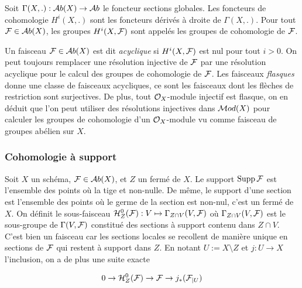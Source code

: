 \begin{defn}
Soit $\Gamma(X,.):\mathcal{A} b(X)\rightarrow \mathcal{A} b$ le foncteur sections globales. Les foncteurs de cohomologie $H^i(X,.)$ sont les foncteurs dérivés à droite de $\Gamma(X,.)$. Pour tout $\mathcal{F}\in \mathcal{A} b(X)$, les groupes $H^i(X,\mathcal{F})$ sont appelés les groupes de cohomologie de $\mathcal{F}$.
\end{defn}


Un faisceau $\mathcal{F}\in \mathcal{A} b(X)$ est dit \textit{acyclique} si $H^i(X,\mathcal{F})$ est nul pour tout $i>0$. On peut toujours remplacer une résolution injective de $\mathcal{F}$ par une résolution acyclique pour le calcul des groupes de cohomologie de $\mathcal{F}$. Les faisceaux \textit{flasques} donne une classe de faisceaux acycliques, ce sont les faisceaux dont les flèches de restriction sont surjectives. De plus, tout $\mathcal{O}_X$-module injectif est flasque, on en déduit que l'on peut utiliser des résolutions injectives dans $\mathcal{M} od(X)$ pour calculer les groupes de cohomologie d'un $\mathcal{O}_X$-module vu comme faisceau de groupes abélien sur $X$.

\subsubsection{Cohomologie à support}

Soit $X$ un schéma, $\mathcal{F}\in \mathcal{A} b(X)$, et $Z$ un fermé de $X$. Le support $\operatorname{Supp}\mathcal{F}$ est l'ensemble des points où la tige et non-nulle. De même, le support d'une section est l'ensemble des points où le germe de la section est non-nul, c'est un fermé de $X$. On définit le sous-faisceau $\mathcal{H} ^0 _Z(\mathcal{F}):V\mapsto \Gamma_{Z\cap V}(V,\mathcal{F})$ où $\Gamma_{Z\cap V}(V,\mathcal{F})$ est le sous-groupe de $\Gamma(V,\mathcal{F})$ constitué des sections à support contenu dans $Z\cap V$. C'est bien un faisceau car les sections locales se recollent de manière unique en sections de $\mathcal{F}$ qui restent à support dans $Z$. En notant $U:=X\setminus Z$ et $j:U\rightarrow X$ l'inclusion, on a de plus une suite exacte

\begin{equation}\label{eq:ESSupport}
0\rightarrow \mathcal{H}^0 _Z(\mathcal{F}) \rightarrow \mathcal{F} \rightarrow j_*(\mathcal{F}_{|U})
\end{equation}

